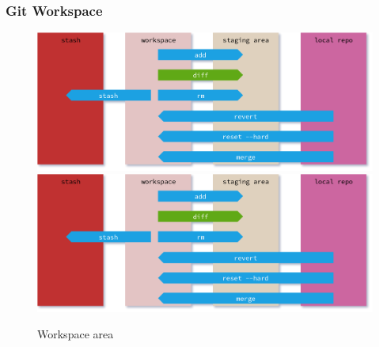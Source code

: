 \begin{frame}[fragile]
    \frametitle{Git Workspace}
    \begin{figure}
        \begin{center}
            {
                \includegraphics[width=1\textwidth,keepaspectratio]{./images/GitAreas-Workspace.png}
            }
            {
                \includegraphics[height=0.75\textheight,keepaspectratio]{./images/GitAreas-Workspace.png}
            }
            \caption{Workspace area}
        \end{center}
    \end{figure}
\end{frame}

